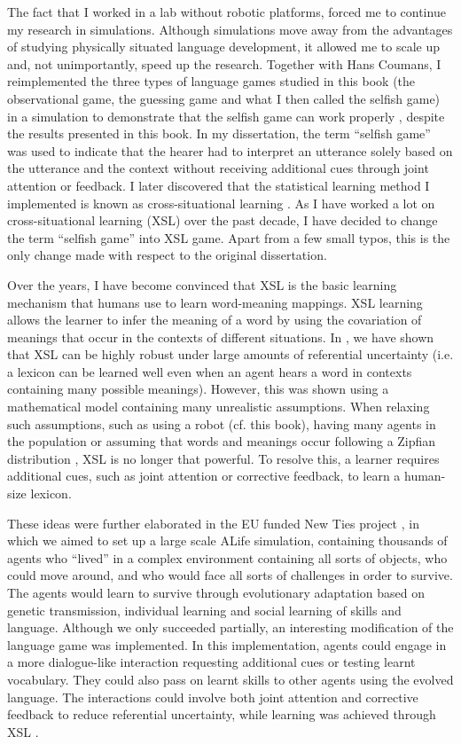 The fact that I worked in a lab without robotic platforms, forced me to continue my research in simulations. Although simulations move away from the advantages of studying physically situated language development, it allowed me to scale up and, not unimportantly, speed up the research. 
Together with Hans Coumans, I reimplemented the three types of language games studied in this book (the observational game, the guessing game and what I then called the selfish game) in a simulation to demonstrate that the selfish game can work properly \citep{vogtcoumans:2003}, despite the results presented in this book. In my dissertation, the term ``selfish game'' was used to indicate that the hearer had to interpret an utterance solely based on the utterance and the context without receiving additional cues through joint attention or feedback. I later discovered that the statistical learning method I implemented is known as {\sc cross-situational learning} \citep{pinker:1989,siskind:1996}. As I have worked a lot on cross-situational learning (XSL) over the past decade, I have decided to change the term ``selfish game'' into XSL game. Apart from a few small typos, this is the only change made with respect to the original dissertation.

Over the years, I have become convinced that XSL is the basic learning mechanism that humans use to learn word-meaning mappings. XSL learning allows the learner to infer the meaning of a word by using the covariation of meanings that occur in the contexts of different situations. In \citet{smithetal:2006}, we have shown that XSL can be highly robust under large amounts of referential uncertainty (i.e. a lexicon can be learned well even when an agent hears a word in contexts containing many possible meanings). However, this was shown using a mathematical model containing many unrealistic assumptions. When relaxing such assumptions, such as using a robot (cf. this book), having many agents in the population \citep{vogtcoumans:2003} or assuming that words and meanings occur following a Zipfian distribution \citep{vogt:2012}, XSL is no longer that powerful. To resolve this, a learner requires additional cues, such as joint attention or corrective feedback, to learn a human-size lexicon. 

These ideas were further elaborated in the EU funded New Ties project \citep{gilbertetal:2006}, in which we aimed to set up a large scale ALife simulation, containing thousands of agents who ``lived'' in a complex environment containing all sorts of objects, who could move around, and who would face all sorts of challenges in order to survive. The agents would learn to survive through evolutionary adaptation based on genetic transmission, individual learning and social learning of skills and language. Although we only succeeded partially, an interesting modification of the language game was implemented. In this implementation, agents could engage in a more dialogue-like interaction requesting additional cues or testing learnt vocabulary. They could also pass on learnt skills to other agents using the evolved language. The interactions could involve both joint attention and corrective feedback to reduce referential uncertainty, while learning was achieved through XSL \citep{vogtdivina:2007,vogthaasdijk:2010}.

